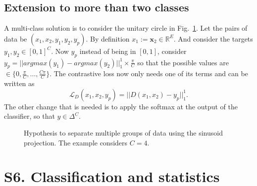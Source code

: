 \documentclass[10pt]{article}
\begin{document}
\subsection*{Extension to more than two classes}

A multi-class solution is to consider the unitary circle in Fig.~\ref{fig:s2}. Let the pairs of data be $(x_1, x_2, y_1, y_2, y_p)$. By definition $x_1 := \mathbf{x}_2 \in \mathbb{R}^E$. And consider the targets $y_1, y_2 \in [0,1]^C$. Now $y_p$ instead of being in $[0,1]$, consider $y_p=||argmax(y_1) - argmax(y_2)||_1^1 \times \frac{\pi}{C}$ so that the possible values are $\in \{0,\frac{\pi}{C}, \dots, \frac{C\pi}{C}\}$. The contrastive loss now only needs one of its terms and can be written as
\begin{equation}\label{future_work:equation:multi_contrastive}
    \mathcal{L}_D(x_1, x_2, y_p) = ||D(x_1, x_2)-y_p||_1^1 .
\end{equation}
The other change that is needed is to apply the softmax at the output of the classifier, so that $y\in \Delta^C$.

\begin{figure}[!htbp]
    \centering
    \caption{Hypothesis to separate multiple groups of data using the sinusoid projection. The example considers $C=4$.}
    \label{fig:s2}
\end{figure}

\section*{S6. Classification and statistics}
\end{document}
